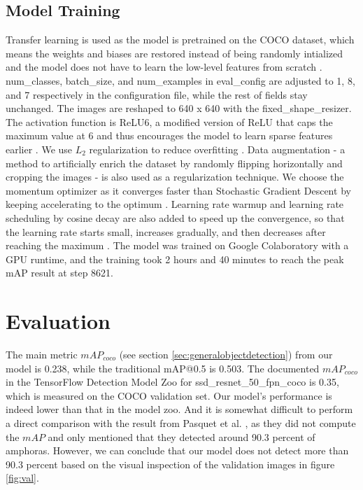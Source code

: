 \documentclass[a4paper, 11pt, oneside]{article}
\begin{document}
  \subsection{Model Training}

  Transfer learning \cite{torrey2010transfer} is used as the model is pretrained on the COCO dataset, which means the
  weights and biases are restored instead of being randomly intialized and the model does not have to learn the low-level
  features from scratch \cite{geron2019hands}. num\_classes, batch\_size, and num\_examples in eval\_config are adjusted
  to 1, 8, and 7 respectively in the configuration file, while the rest of fields stay unchanged. The images are reshaped
  to 640 x 640 with the fixed\_shape\_resizer. The activation function is ReLU6, a modified version of ReLU that caps
  the maximum value at 6 and thus encourages the model to learn sparse features earlier
  \cite{krizhevsky2010convolutional}. We use $L_2$ regularization \cite{ng2004feature} to reduce overfitting
  \cite{hawkins2004problem}. Data augmentation \cite{geron2019hands, krizhevsky2012imagenet} - a method to artificially
  enrich the dataset by randomly flipping horizontally and cropping the images - is also used as a regularization technique.
  We choose the momentum optimizer \cite{polyak1964some} as it converges faster than Stochastic Gradient Descent
  \cite{bottou2010large} by keeping accelerating to the optimum \cite{geron2019hands}. Learning rate warmup and learning
  rate scheduling by cosine decay are also added to speed up the convergence, so that the learning rate starts small,
  increases gradually, and then decreases after reaching the maximum
  \cite{geron2019hands, goyal2017accurate, senior2013empirical, loshchilov2016sgdr}.
  The model was trained on Google Colaboratory \cite{colab} with a GPU runtime, and the training took 2 hours and 40
  minutes to reach the peak mAP result at step 8621.

  \section{Evaluation}

  The main metric $mAP_{coco}$ (see section \ref{sec:generalobjectdetection}) from our model is 0.238, while the
  traditional mAP@0.5 is 0.503. The documented $mAP_{coco}$ in the TensorFlow Detection Model Zoo for
  ssd\_resnet\_50\_fpn\_coco is 0.35, which is measured on the COCO validation set. Our model's performance is indeed
  lower than that in the model zoo. And it is somewhat difficult to perform a direct comparison with the result from
  Pasquet et al. \cite{pasquet2017amphora}, as they did not compute the $mAP$ and only mentioned that they detected
  around 90.3 percent of amphoras. However, we can conclude that our model does not detect more than 90.3 percent based
  on the visual inspection of the validation images in figure \ref{fig:val}.
\end{document}
